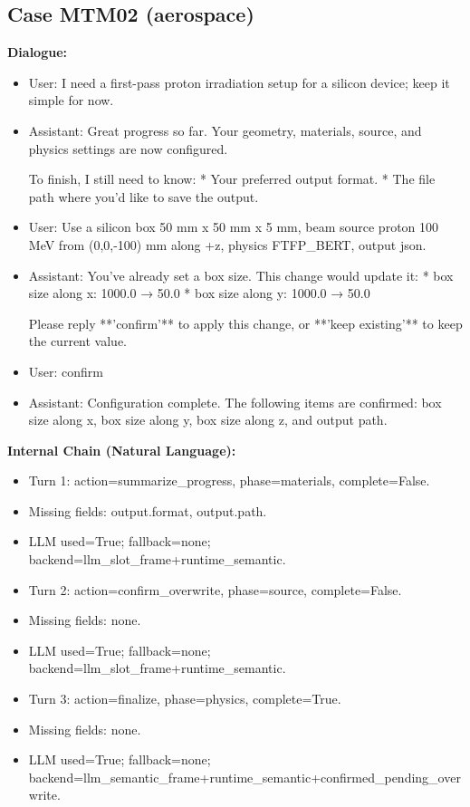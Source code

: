 \documentclass[11pt]{ctexart}
\begin{document}
\subsection{Case MTM02 (aerospace)}
\textbf{Dialogue:}
\begin{itemize}
\item User: I need a first-pass proton irradiation setup for a silicon device; keep it simple for now.
\item Assistant: Great progress so far. Your geometry, materials, source, and physics settings are now configured.

To finish, I still need to know:
*   Your preferred output format.
*   The file path where you'd like to save the output.
\item User: Use a silicon box 50 mm x 50 mm x 5 mm, beam source proton 100 MeV from (0,0,-100) mm along +z, physics FTFP\_BERT, output json.
\item Assistant: You've already set a box size. This change would update it:
*   box size along x: 1000.0 → 50.0
*   box size along y: 1000.0 → 50.0

Please reply **'confirm'** to apply this change, or **'keep existing'** to keep the current value.
\item User: confirm
\item Assistant: Configuration complete. The following items are confirmed: box size along x, box size along y, box size along z, and output path.
\end{itemize}
\textbf{Internal Chain (Natural Language):}
\begin{itemize}
\item Turn 1: action=summarize\_progress, phase=materials, complete=False.
\item Missing fields: output.format, output.path.
\item LLM used=True; fallback=none; backend=llm\_slot\_frame+runtime\_semantic.
\item Turn 2: action=confirm\_overwrite, phase=source, complete=False.
\item Missing fields: none.
\item LLM used=True; fallback=none; backend=llm\_slot\_frame+runtime\_semantic.
\item Turn 3: action=finalize, phase=physics, complete=True.
\item Missing fields: none.
\item LLM used=True; fallback=none; backend=llm\_semantic\_frame+runtime\_semantic+confirmed\_pending\_overwrite.
\end{itemize}
\end{document}

